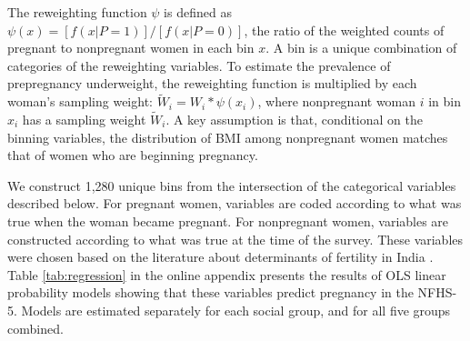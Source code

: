 \documentclass[12pt]{article}
\begin{document}
The reweighting function \(\psi\) is defined as \(\psi(x)=[f(x|P=1)]/[f(x|P=0)]\), the ratio of the weighted counts of pregnant to nonpregnant women in each bin \(x\).  A bin is a unique combination of categories of the reweighting variables. To estimate the prevalence of prepregnancy underweight, the reweighting function is multiplied by each woman's sampling weight: \(\tilde{W}_i = W_i * \psi(x_i)\), where nonpregnant woman \(i\) in bin \(x_i\) has a sampling weight \(\tilde{W}_i\). A key assumption is that, conditional on the binning variables, the distribution of BMI among nonpregnant women matches that of women who are beginning pregnancy.

We construct 1,280 unique bins from the intersection of the categorical variables described below.  For pregnant women, variables are coded according to what was true when the woman became pregnant.  For nonpregnant women, variables are constructed according to what was true at the time of the survey.  These variables were chosen based on the literature about determinants of fertility in India \citep{jha2025effects, singh2022key, dharmalingam2014determinants}.  Table \ref{tab:regression} in the online appendix presents the results of OLS linear probability models showing that these variables predict pregnancy in the NFHS-5.  Models are estimated separately for each social group, and for all five groups combined. 
\end{document}
